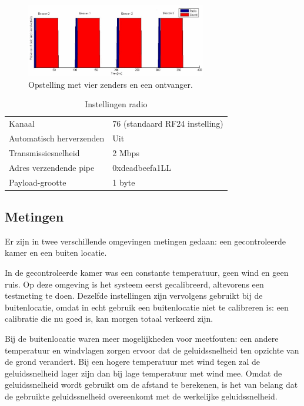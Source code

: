\documentclass[a4paper,10pt]{article}
\begin{document}
\begin{figure}[ht!]
    \centering
    \includegraphics[width=0.7\textwidth]{tijdsdiagram_handleiding.png}
    \caption{Opstelling met vier zenders en een ontvanger.}
    \label{fig:tijdsdiagram_handleiding}
\end{figure}

\begin{table}[h]
    \begin{minipage}{\textwidth}
        \begin{tabular}{ l l }
            Kanaal                    & 76 (standaard RF24 instelling) \\
            Automatisch herverzenden  & Uit               \\
            Transmissiesnelheid       & 2 Mbps            \\
            Adres verzendende pipe    & 0xdeadbeefa1LL    \\
            Payload-grootte           & 1 byte
        \end{tabular}
        \caption{Instellingen radio}
        \label{table:instellingen}        
    \end{minipage}
\end{table}

\subsection{Metingen}
Er zijn in twee verschillende omgevingen metingen gedaan: een gecontroleerde kamer en een buiten locatie.

In de gecontroleerde kamer was een constante temperatuur, geen wind en geen ruis. Op deze omgeving is het systeem eerst gecalibreerd, altevorens een testmeting te doen. Dezelfde instellingen zijn vervolgens gebruikt bij de buitenlocatie, omdat in echt gebruik een buitenlocatie niet te calibreren is: een calibratie die nu goed is, kan morgen totaal verkeerd zijn.

Bij de buitenlocatie waren meer mogelijkheden voor meetfouten: een andere temperatuur en windvlagen zorgen ervoor dat de geluidssnelheid ten opzichte van de grond verandert. Bij een hogere temperatuur met wind tegen zal de geluidssnelheid lager zijn dan bij lage temperatuur met wind mee. Omdat de geluidssnelheid wordt gebruikt om de afstand te berekenen, is het van belang dat de gebruikte geluidssnelheid overeenkomt met de werkelijke geluidssnelheid.
\end{document}
